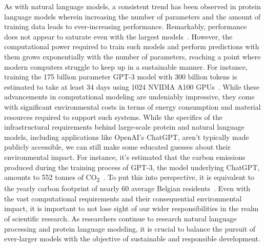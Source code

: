 As with natural language models, a consistent trend has been observed in protein language models wherein increasing the number of parameters and the amount of training data leads to ever-increasing performance. Remarkably, performance does not appear to saturate even with the largest models~\cite{Ofer}. However, the computational power required to train such models and perform predictions with them grows exponentially with the number of parameters, reaching a point where modern computers struggle to keep up in a sustainable manner. For instance, training the 175 billion parameter GPT-3 model with 300 billion tokens is estimated to take at least 34 days using 1024 NVIDIA A100 GPUs~\cite{gptrain}. While these advancements in computational modeling are undeniably impressive, they come with significant environmental costs in terms of energy consumption and material resources required to support such systems. While the specifics of the infrastructural requirements behind large-scale protein and natural language models, including applications like OpenAI's ChatGPT, aren't typically made publicly accessible, we can still make some educated guesses about their environmental impact. For instance, it's estimated that the carbon emissions produced during the training process of GPT-3, the model underlying ChatGPT, amounts to 552 tonnes of CO\textsubscript{2}~\cite{co2}. To put this into perspective, it is equivalent to the yearly carbon footprint of nearly 60 average Belgian residents~\cite{ghg}. Even with the vast computational requirements and their consequential environmental impact, it is important to not lose sight of our wider responsibilities in the realm of scientific research. As researchers continue to research natural language processing and protein language modeling, it is crucial to balance the pursuit of ever-larger models with the objective of sustainable and responsible development.